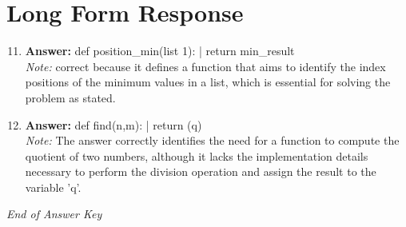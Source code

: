 \documentclass[12pt]{article}
\begin{document}
\section*{Long Form Response}
\begin{enumerate}[label=\arabic*.]
\setcounter{enumi}{10}
\item \textbf{Answer:} def position\_min(list 1): | return min\_result
\\ \textit{Note:} correct because it defines a function that aims to identify the index positions of the minimum values in a list, which is essential for solving the problem as stated.
\item \textbf{Answer:} def find(n,m): | return (q)
\\ \textit{Note:} The answer correctly identifies the need for a function to compute the quotient of two numbers, although it lacks the implementation details necessary to perform the division operation and assign the result to the variable 'q'.
\end{enumerate}

\vfill
\noindent\textit{End of Answer Key}
\end{document}
